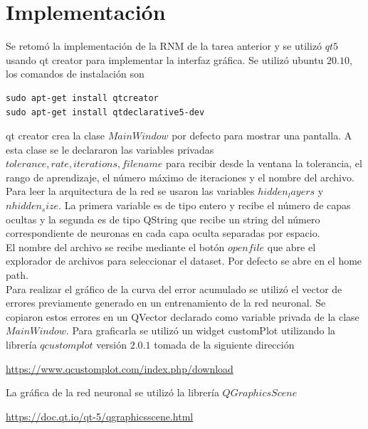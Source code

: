 \documentclass[12pt,letterpaper]{article}
\theoremstyle{definition}
\theoremstyle{definition}
\theoremstyle{definition}
\theoremstyle{definition}
\theoremstyle{definition}
\theoremstyle{definition}
\begin{document}
\section{Implementación}
Se retomó la implementación de la RNM de la tarea anterior y se utilizó $ qt5 $ usando qt creator para implementar la interfaz gráfica. Se utilizó ubuntu $ 20.10 $, los comandos de instalación son
\lstset{language= C++, breaklines=true, basicstyle=\footnotesize}
\begin{lstlisting}[frame=single]
sudo apt-get install qtcreator
sudo apt-get install qtdeclarative5-dev
\end{lstlisting} 
qt creator crea la clase $ MainWindow $ por defecto para mostrar una pantalla. A esta clase se le declararon las variables privadas
$ tolerance, rate, iterations, filename $ para recibir desde la ventana la tolerancia, el rango de aprendizaje, el número máximo de iteraciones y el nombre del archivo. \\
Para leer la arquitectura de la red se usaron las variables $ hidden_layers $ y $ nhidden_size $. La primera variable es de tipo entero y recibe el número de capas ocultas y la segunda es de tipo QString que recibe un string del número correspondiente de neuronas en cada capa oculta separadas por espacio.\\
El nombre del archivo se recibe mediante el botón $ open file $ que abre el explorador de archivos para seleccionar el dataset. Por defecto se abre en el home path. \\
Para realizar el gráfico de la curva del error acumulado se utilizó el vector de errores previamente generado en un entrenamiento de la red neuronal. Se copiaron estos errores en un QVector declarado como variable privada de la clase $ MainWindow $. Para graficarla se utilizó un widget customPlot utilizando la librería $ qcustomplot $ versión $ 2.0.1 $ tomada de la siguiente dirección
\begin{center}
	\url{https://www.qcustomplot.com/index.php/download} 
\end{center}
La gráfica de la red neuronal se utilizó la librería $ QGraphicsScene $ 
\begin{center}
	\url{https://doc.qt.io/qt-5/qgraphicsscene.html}
\end{center}
\end{document}
